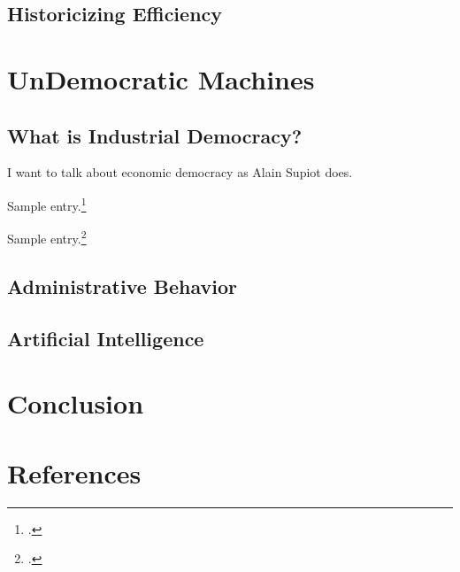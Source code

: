 \documentclass[version=last,draft=false,paper=A4,portrait,twoside=true,twocolumn=false,headinclude=false,footinclude=false,fontsize=11,BCOR=20mm,DIV=calc,pagesize=auto,titlepage=firstiscover,mpinclude=false,open=right,chapterprefix=true,numbers=autoendperiod,headsepline=false,parskip=false]{scrbook}
\begin{document}
\section{Historicizing Efficiency}
\label{sec:org307abdb}
\chapter{UnDemocratic Machines}
\label{sec:org8d9952f}
\section{What is Industrial Democracy?}
\label{sec:orgee7432d}
I want to talk about economic democracy as Alain Supiot does.  

Sample entry.\footcite{babbage1832}

Sample entry.\footcite{simon2001b}

\lipsum
\section{Administrative Behavior}
\label{sec:org55fe848}
\lipsum
\section{Artificial Intelligence}
\label{sec:org725f443}
\lipsum

\backmatter
\chapter{Conclusion} 
\lipsum
\chapter{References} 
\printbibliography[heading=none]
\end{document}
